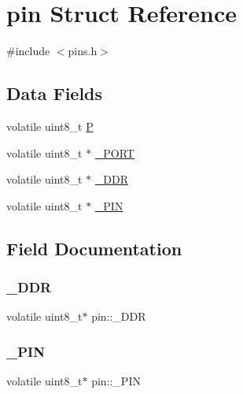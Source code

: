 \hypertarget{structpin}{}\section{pin Struct Reference}
\label{structpin}


{\ttfamily \#include $<$pins.\+h$>$}

\subsection*{Data Fields}
\begin{DoxyCompactItemize}
\item 
volatile uint8\+\_\+t \mbox{\hyperlink{structpin_a367c20491645205002483e3d3c94760f}{P}}
\item 
volatile uint8\+\_\+t $\ast$ \mbox{\hyperlink{structpin_a8533a7608dbc5287081146f6e013bc17}{\+\_\+\+P\+O\+RT}}
\item 
volatile uint8\+\_\+t $\ast$ \mbox{\hyperlink{structpin_a6bff1e5dc48e9042d2ea87c648f5ca5f}{\+\_\+\+D\+DR}}
\item 
volatile uint8\+\_\+t $\ast$ \mbox{\hyperlink{structpin_a49fe3709ef56c543cc6ecd056276e408}{\+\_\+\+P\+IN}}
\end{DoxyCompactItemize}


\subsection{Field Documentation}
\mbox{\label{structpin_a6bff1e5dc48e9042d2ea87c648f5ca5f}} 
\subsubsection{\texorpdfstring{\+\_\+\+D\+DR}{\_DDR}}
{\footnotesize\ttfamily volatile uint8\+\_\+t$\ast$ pin\+::\+\_\+\+D\+DR}

\mbox{\label{structpin_a49fe3709ef56c543cc6ecd056276e408}} 
\subsubsection{\texorpdfstring{\+\_\+\+P\+IN}{\_PIN}}
{\footnotesize\ttfamily volatile uint8\+\_\+t$\ast$ pin\+::\+\_\+\+P\+IN}

